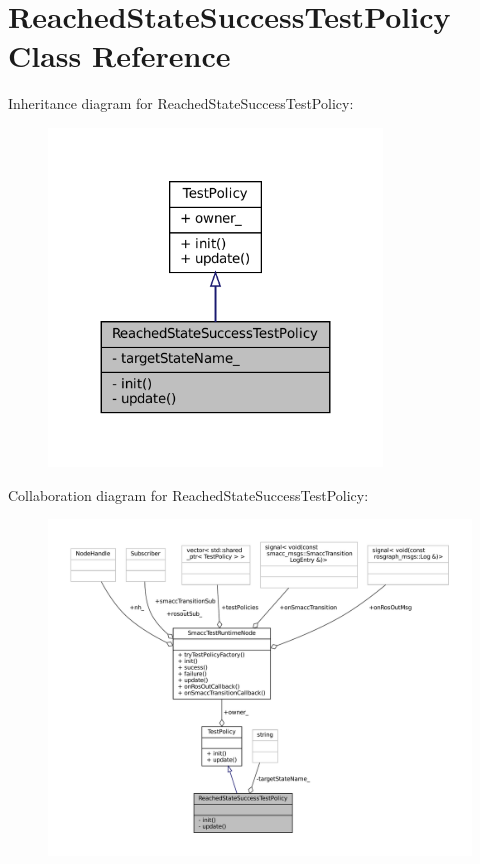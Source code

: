 \hypertarget{classReachedStateSuccessTestPolicy}{}\section{Reached\+State\+Success\+Test\+Policy Class Reference}
\label{classReachedStateSuccessTestPolicy}


Inheritance diagram for Reached\+State\+Success\+Test\+Policy\+:
\nopagebreak
\begin{figure}[H]
\begin{center}
\leavevmode
\includegraphics[width=251pt]{classReachedStateSuccessTestPolicy__inherit__graph}
\end{center}
\end{figure}


Collaboration diagram for Reached\+State\+Success\+Test\+Policy\+:
\nopagebreak
\begin{figure}[H]
\begin{center}
\leavevmode
\includegraphics[width=350pt]{classReachedStateSuccessTestPolicy__coll__graph}
\end{center}
\end{figure}
